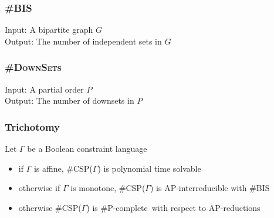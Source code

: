 \documentclass[a4paper,handout]{beamer}
\newcommand{\pname}[1]{\textsc{#1}}
\newcommand{\ccsp}{\#CSP}
\newcommand{\cbis}{\#\textsc{BIS}}
\newcommand{\cdsp}{\pname{\#DownSets}}
\newcommand{\cpc}{\#P-complete}
\theoremstyle{definition}
\begin{document}
\begin{frame}
\frametitle{\cbis}
\begin{center}
\end{center}

\begin{definition}[\cbis]
Input: A bipartite graph \(G\)\\
Output: The number of independent sets in \(G\)
\end{definition}
\end{frame}

\begin{frame}
\frametitle{\cdsp}
\begin{center}
\end{center}

\begin{definition} [\cdsp]
Input: A partial order \(P\) \\
Output: The number of downsets in \(P\)
\end{definition}
\end{frame}

\begin{frame}
\frametitle{Trichotomy}
\begin{theorem} 
Let \(\Gamma\) be a Boolean constraint language\\
\begin{itemize}
\item if \(\Gamma\) is \textcolor{mygreen}{affine}, \ccsp(\(\Gamma\)) is polynomial time solvable
\item otherwise if \(\Gamma\) is \textcolor{mygreen}{monotone}, \ccsp(\(\Gamma\)) is AP-interreducible with \cbis
\item otherwise \ccsp(\(\Gamma\)) is \cpc\ with respect to AP-reductions
\end{itemize}
\end{theorem}
\end{frame}
\end{document}
